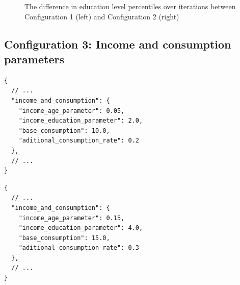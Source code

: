 \documentclass[english]{projectreport}
\begin{document}
\begin{figure}[H]
\begin{center}
%
\end{center}
\caption{The difference in education level percentiles over iterations between Configuration 1 (left) and Configuration 2 (right)}
\end{figure}

\subsection{Configuration 3: Income and consumption parameters}

\begin{minipage}{0.48\textwidth}
\begin{verbatim}
{
  // ...
  "income_and_consumption": {
    "income_age_parameter": 0.05,
    "income_education_parameter": 2.0,
    "base_consumption": 10.0,
    "aditional_consumption_rate": 0.2
  },
  // ...
}
\end{verbatim}
\end{minipage}
\hfill
\begin{minipage}{0.48\textwidth}
\begin{verbatim}
{
  // ...
  "income_and_consumption": {
    "income_age_parameter": 0.15,
    "income_education_parameter": 4.0,
    "base_consumption": 15.0,
    "aditional_consumption_rate": 0.3
  },
  // ...
}
\end{verbatim}
\end{minipage}
\end{document}
